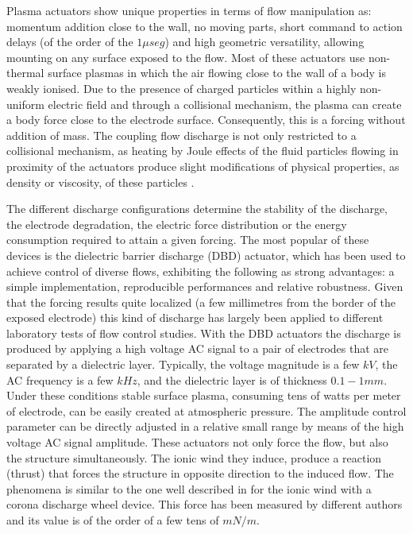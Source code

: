 \documentclass[review]{elsarticle}
\begin{document}
Plasma actuators show unique properties in terms of flow manipulation as: momentum addition close to the wall, no moving parts, short command to action delays (of the order of the $1\mu seg$) and high geometric versatility, allowing mounting on any surface exposed to the flow. Most of these actuators use non-thermal surface plasmas in which the air flowing close to the wall of a body is weakly ionised. Due to the presence of charged particles within a highly non-uniform electric field and through a collisional mechanism, the plasma can create a body force close to the electrode surface. Consequently, this is a forcing without addition of mass. The coupling flow discharge is not only restricted to a collisional mechanism, as heating by Joule effects of the fluid particles flowing in proximity of the actuators produce slight modifications of physical properties, as density or viscosity, of these particles \citep{Jayaraman2007}.

The different discharge configurations determine the stability of the discharge, the electrode degradation, the electric force distribution or the energy consumption required to attain a given forcing. The most popular of these devices is the dielectric barrier discharge (DBD) actuator, which has been used to achieve control of diverse flows, exhibiting the following as strong advantages: a simple implementation, reproducible performances and relative robustness. Given that the forcing results quite localized (a few millimetres from the border of the exposed electrode) this kind of discharge has largely been applied to different laboratory tests of flow control studies. With the DBD actuators the discharge is produced by applying a high voltage AC signal to a pair of electrodes that are separated by a dielectric layer. Typically, the voltage magnitude is a few $kV$, the AC frequency is a few $kHz$, and the dielectric layer is of thickness $0.1-1 mm$. Under these conditions stable surface plasma, consuming tens of watts per meter of electrode, can be easily created at atmospheric pressure. The amplitude control parameter can be directly adjusted in a relative small range by means of the high voltage AC signal amplitude. These actuators not only force the flow, but also the structure simultaneously. The ionic wind they induce, produce a reaction (thrust) that forces the structure in opposite direction to the induced flow. The  phenomena is similar to the one well described in \cite{Loeb1939} for the ionic wind with a corona discharge wheel device. This force has been measured by different authors and its value is of the order of a few tens of $mN/m$. 
\end{document}
